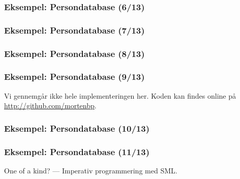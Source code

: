 \documentclass[slidestop,compress,mathserif, xcolor=table]{beamer}
\begin{document}
\begin{frame}[fragile]
  \frametitle{Eksempel: Persondatabase \quad (6/13)}
  \begin{block}{}
    
  \end{block}
\end{frame}

\begin{frame}[fragile]
  \frametitle{Eksempel: Persondatabase \quad (7/13)}
  \begin{block}{}
    
  \end{block}
\end{frame}

\begin{frame}[fragile]
  \frametitle{Eksempel: Persondatabase \quad (8/13)}
  \begin{block}{}
    
  \end{block}
\end{frame}

\begin{frame}
  \frametitle{Eksempel: Persondatabase \quad (9/13)}
  Vi gennemgår ikke hele implementeringen her. Koden kan findes online på
  \url{http://github.com/mortenbp}.

  \begin{block}{}
    
  \end{block}
\end{frame}

\begin{frame}
  \frametitle{Eksempel: Persondatabase \quad (10/13)}
  \begin{block}{}
    
  \end{block}
  \begin{block}{}
    
  \end{block}
  \begin{block}{}
    
  \end{block}
\end{frame}

\begin{frame}
  \frametitle{Eksempel: Persondatabase \quad (11/13)}
  One of a kind? --- Imperativ programmering med SML.
  \begin{block}{}
    
  \end{block}
\end{frame}
\end{document}

